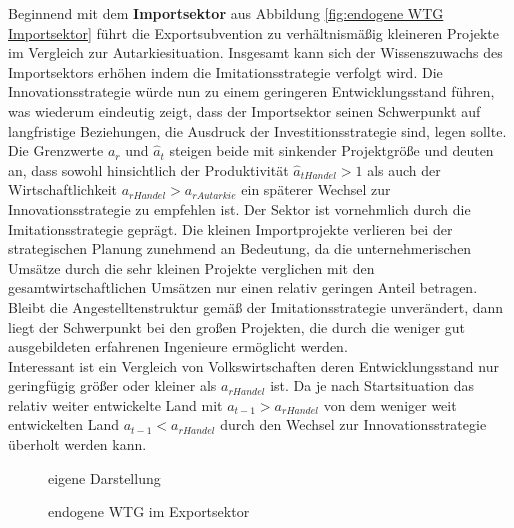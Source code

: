 Beginnend mit dem \textbf{Importsektor} aus Abbildung \ref{fig:endogene WTG Importsektor} führt die Exportsubvention zu verhältnismäßig kleineren Projekte im Vergleich zur Autarkiesituation. Insgesamt kann sich der Wissenszuwachs des Importsektors erhöhen indem die \textcolor[rgb]{0,0.32,0}{Imitationsstrategie} verfolgt wird. Die \textcolor[rgb]{0.74,0.97,0.22}{Innovationsstrategie} würde nun zu einem geringeren Entwicklungsstand führen, was wiederum eindeutig zeigt, dass der Importsektor seinen Schwerpunkt auf langfristige Beziehungen, die Ausdruck der \textcolor[rgb]{0,0.32,0}{Investitionsstrategie} sind, legen sollte. Die Grenzwerte $a_r$ und $\hat{a}_t$ steigen beide mit sinkender Projektgröße und deuten an, dass sowohl hinsichtlich der Produktivität $\hat{a}_{tHandel}>1$ als auch der Wirtschaftlichkeit $a_{rHandel}>a_{rAutarkie}$ ein späterer Wechsel zur \textcolor[rgb]{0.74,0.97,0.22}{Innovationsstrategie} zu empfehlen ist. Der Sektor ist vornehmlich durch die \textcolor[rgb]{0,0.32,0}{Imitationsstrategie} geprägt. Die kleinen Importprojekte verlieren bei der strategischen Planung zunehmend an Bedeutung, da die unternehmerischen Umsätze durch die sehr kleinen Projekte verglichen mit den gesamtwirtschaftlichen Umsätzen nur einen relativ geringen Anteil betragen. Bleibt die Angestelltenstruktur gemäß der \textcolor[rgb]{0,0.32,0}{Imitationsstrategie} unverändert, dann liegt der Schwerpunkt bei den großen Projekten, die durch die weniger gut ausgebildeten erfahrenen Ingenieure ermöglicht werden.\\ Interessant ist ein Vergleich von Volkswirtschaften deren Entwicklungsstand nur geringfügig größer oder kleiner als $a_{rHandel}$ ist. Da je nach Startsituation das relativ weiter entwickelte Land mit $a_{t-1}>a_{rHandel}$ von dem weniger weit entwickelten Land $a_{t-1}<a_{rHandel}$ durch den Wechsel zur \textcolor[rgb]{0.74,0.97,0.22}{Innovationsstrategie} überholt werden kann.\\

	\begin{figure}[htb]
		\hfill{}  eigene Darstellung
		\caption{endogene WTG im Exportsektor}
		\label{fig:endogene WTG Exportsektor}
	\end{figure}

